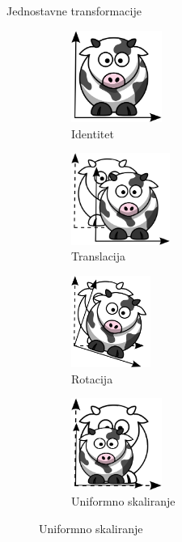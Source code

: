 \documentclass[9pt]{beamer}
\begin{document}
\begin{frame}{Jednostavne transformacije}
	\begin{figure}
		\begin{center}
			\begin{subfigure}[b]{0.35\linewidth}
				\includegraphics[height=3cm]{slike/funny_cow_template_1.png}
				\caption{Identitet}
			\end{subfigure}
			\begin{subfigure}[b]{0.35\linewidth}
				\includegraphics[height=3cm]{slike/funny_cow_translate.png}
				\caption{Translacija}
			\end{subfigure}
			\begin{subfigure}[b]{0.35\linewidth}
				\includegraphics[height=3cm]{slike/funny_cow_rotate.png}
				\caption{Rotacija}
			\end{subfigure}
			\begin{subfigure}[b]{0.35\linewidth}
				\includegraphics[height=3cm]{slike/funny_cow_scale.png}
				\caption{Uniformno skaliranje}
			\end{subfigure}
		\end{center}
	\end{figure}
\end{frame}
\end{document}
